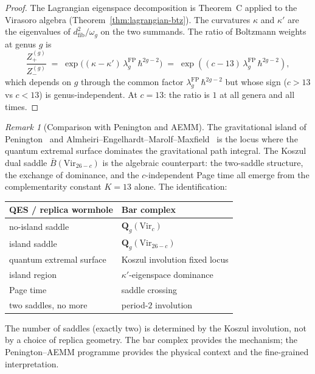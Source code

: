 \documentclass[11pt,reqno]{amsart}
\theoremstyle{definition}
\theoremstyle{remark}
\newtheorem{remark}[theorem]{Remark}
\providecommand{\barB}{\bar{B}}
\begin{document}
\begin{proof}
The Lagrangian eigenspace decomposition is
Theorem~C applied to the Virasoro algebra
(Theorem~\ref{thm:lagrangian-btz}). The curvatures
$\kappa$ and $\kappa'$ are the eigenvalues of
$d_{\mathrm{fib}}^2/\omega_g$ on the two summands. The
ratio of Boltzmann weights at genus $g$ is
\[
\frac{Z_+^{(g)}}{Z_-^{(g)}}
\;=\;
\exp\!\bigl((\kappa - \kappa')\,
\lambda_g^{\mathrm{FP}}\,\hbar^{2g-2}\bigr)
\;=\;
\exp\!\left((c-13)\,
\lambda_g^{\mathrm{FP}}\,\hbar^{2g-2}\right)\!,
\]
which depends on $g$ through the common factor
$\lambda_g^{\mathrm{FP}}\,\hbar^{2g-2}$ but whose sign
($c > 13$ vs $c < 13$) is genus-independent.
At $c = 13$: the ratio is $1$ at all genera and all times.
\end{proof}

\begin{remark}[Comparison with Penington and AEMM]
\label{rem:island}
The gravitational island of
Penington~\cite{Pen19} and
Almheiri--Engelhardt--Marolf--Maxfield~\cite{AEMM19,AMMZ19}
is the locus where the quantum extremal surface dominates the
gravitational path integral. The Koszul dual saddle
$\barB(\mathrm{Vir}_{26-c})$ is the algebraic counterpart:
the two-saddle structure, the exchange of dominance, and the
$c$-independent Page time all emerge from the complementarity
constant $K = 13$ alone.
The identification:
\begin{center}
\small
\renewcommand{\arraystretch}{1.2}
\begin{tabular}{@{}l@{\;\;}l@{}}
\textbf{QES / replica wormhole} & \textbf{Bar complex} \\
\hline
no-island saddle & $\mathbf{Q}_g(\mathrm{Vir}_c)$ \\
island saddle & $\mathbf{Q}_g(\mathrm{Vir}_{26-c})$ \\
quantum extremal surface & Koszul involution fixed locus \\
island region & $\kappa'$-eigenspace dominance \\
Page time & saddle crossing \\
two saddles, no more & period-$2$ involution \\
\end{tabular}
\end{center}
The number of saddles (exactly two) is determined by the Koszul
involution, not by a choice of replica geometry. The bar complex
provides the mechanism; the Penington--AEMM programme provides
the physical context and the fine-grained interpretation.
\end{remark}
\end{document}
